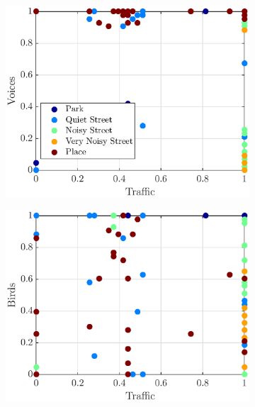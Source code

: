 \documentclass[11pt,a4paper]{article}
\begin{document}
\begin{figure}[h]
    \centering
     \begin{subfigure}[t]{0.33\textwidth}
        \centering
        \includegraphics[width=\textwidth]{figures/tv_pres.eps}
    \end{subfigure}%
    \begin{subfigure}[t]{0.33\textwidth}
        \centering
        \includegraphics[width=\textwidth]{figures/tb_pres.eps}
    \end{subfigure}
    \begin{subfigure}[t]{0.33\textwidth}
        \centering

\end{subfigure}
\end{figure}
\end{document}
